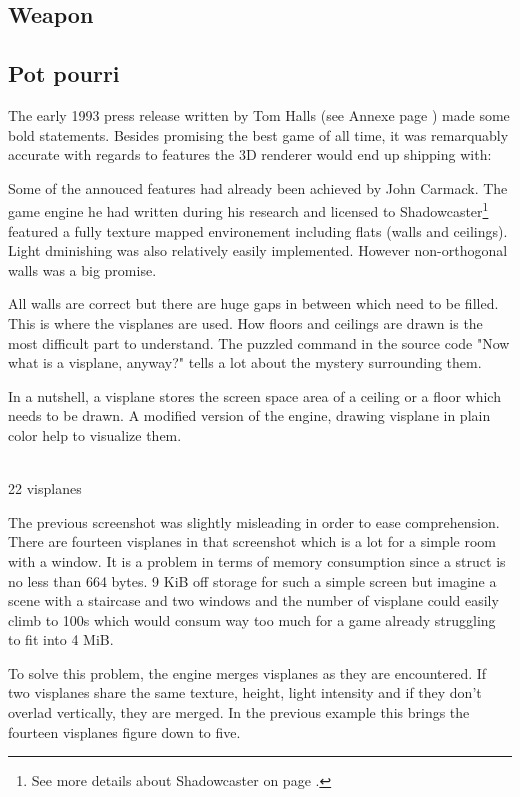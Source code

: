 \subsection{Weapon}

\subsection{Pot pourri}
The early 1993 press release written by Tom Halls (see Annexe page \pageref{label_press_release}) made some bold statements. Besides promising the best game of all time, it was remarquably accurate with regards to features the 3D renderer would end up shipping with:\\
\par
\par
Some of the annouced features had already been achieved by John Carmack. The game engine he had written during his research and licensed to Shadowcaster\footnote{See more details about Shadowcaster on page \pageref{label_shadowcaster}.} featured a fully texture mapped environement including flats (walls and ceilings). Light dminishing was also relatively easily implemented. However non-orthogonal walls was a big promise.\\
\par

 All walls are correct but there are huge gaps in between which need to be filled. This is where the visplanes are used. How floors and ceilings are drawn is the most difficult part to understand. The puzzled command in the source code "Now what is a visplane, anyway?" tells a lot about the mystery surrounding them.\\
\par

In a nutshell, a visplane stores the screen space area of a ceiling or a floor which needs to be drawn. A modified version of the engine, drawing visplane in plain color help to visualize them.\\
\par
{}\\
 22 visplanes
\par
The previous screenshot was slightly misleading in order to ease comprehension. There are fourteen visplanes in that screenshot which is a lot for a simple room with a window. It is a problem in terms of memory consumption since a  struct is no less than 664 bytes. 9 KiB off storage for such a simple screen but imagine a scene with a staircase and two windows and the number of visplane could easily climb to 100s which would consum way too much for a game already struggling to fit into 4 MiB.\\
\par
To solve this problem, the engine merges visplanes as they are encountered. If two visplanes share the same texture, height, light intensity and if they don't overlad vertically, they are merged. In the previous example this brings the fourteen visplanes figure down to five.\\
\par
{}

